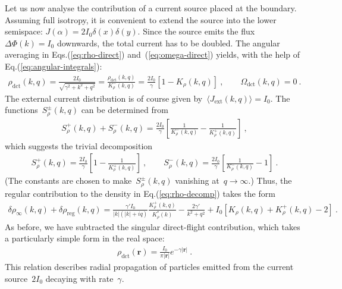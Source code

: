 \documentclass[preprint,aps,eqsecnum, prb]{revtex4-1}
\newcommand{\fplus}[1]{{#1}^{+}}
\newcommand{\fminus}[1]{{#1}^{-}}
\newcommand{\fplusminus}[1]{{#1}^{\pm}}
\newcommand{\dct}[1]{{#1}_\mathrm{dct}}
\begin{document}
Let us now analyse the contribution of a current source placed at the boundary.
Assuming full isotropy, it is convenient to
extend the source into the lower semispace:
$J(\alpha) = 2I_0 \delta(x) \delta(y)$. Since the source
emits the flux~$\Delta \Phi(k) = I_0$ downwards, the total
current has to be doubled.
The angular averaging in Eqs.(\ref{eq:rho-direct}) and~(\ref{eq:omega-direct})
yields, with the help of Eq.(\ref{eq:angular-integrals}):
\begin{align}
  \label{eq:I-src-rho-omega}
  \dct{\rho}(k, q) = \frac{2I_0}{\sqrt{\gamma^2 + k^2 + q^2}} =
  \frac{\dct{\rho}(k, q)}{\fminus{K}_\rho(k, q)} = 
  \frac{2I_0}{\gamma} \left[1 - K_\rho(k, q)\right]\ ,
  \qquad
  \dct{\Omega}(k, q) = 0\ .
\end{align}
The external current distribution is of course
given by~$\langle J_\mathrm{ext}(k, q) \rangle = I_0$.
The functions~$\fplusminus{S}_\rho(k, q)$ can be determined from
\begin{align}
    \fplus{S}_\rho(k, q)
 +  \fminus{S}_\rho(k, q)
  = \frac{2I_0}{\gamma} \left[\frac{1}{\fminus{K}_\rho(k, q)}
  - \frac{1}{\fplus{K}_\rho(k, q)}\right]\ ,
\end{align}
which suggests the trivial decomposition
\begin{align}
  \label{eq:iso-chi}
  \fplus{S}_\rho(k, q) = \frac{2I_0}{\gamma}
  \left[1 - \frac{1}{\fplus{K}_\rho(k, q)}\right]\ ,
  \qquad
  \fminus{S}_\rho(k, q) = \frac{2I_0}{\gamma}
  \left[\frac{1}{\fminus{K}_\rho(k, q)} - 1\right]\ .
\end{align}
(The constants are chosen to make~$\fplusminus{S}_\rho(k, q)$
vanishing at~$q\to\infty$.) Thus, the regular contribution
to the density in Eq.(\ref{eq:rho-decomp}) takes the form
\begin{align}
  \label{eq:iso-rho-reg}
  \delta\rho_\infty(k, q) + \delta\rho_\mathrm{reg}(k, q) =
  \frac{\gamma' I_0}{|k|(|k| + iq)} \frac{\fplus{K}_\rho(k, q)}{
  K^\ast_{\rho}(k)}
  - \frac{2\gamma'}{k^2 + q^2}
  + I_0 \left[K_\rho(k, q) + \fplus{K}_\rho(k, q) - 2\right] \ .
\end{align}
As before, we have subtracted the singular direct-flight contribution,
which takes a particularly simple form in the real space:
\begin{align}
  \label{eq:rho-direct-edge}
  \dct{\rho}({\bm r}) = \frac{I_0}{\pi|{\bm r}|} e^{-\gamma |{\bm r}|}\ .
\end{align}
This relation describes radial propagation of particles emitted from
the current source~$2I_0$ decaying with rate~$\gamma$.
\end{document}
